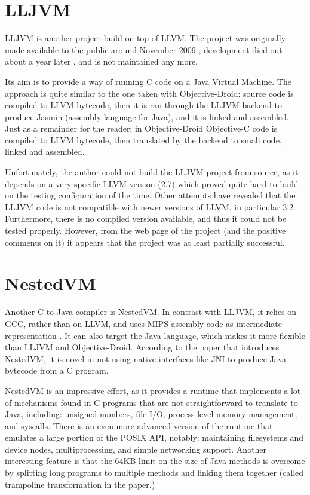 \documentclass[parskip]{cs4rep}
\begin{document}
\section{LLJVM}

LLJVM is another project build on top of LLVM. The project was originally made available to the public around November 2009 \cite{P12}, development died out about a year later \cite{P13}, and is not maintained any more.

Its aim is to provide a way of running C code on a Java Virtual Machine. The approach is quite similar to the one taken with Objective-Droid: source code is compiled to LLVM bytecode, then it is ran through the LLJVM backend to produce Jasmin (assembly language for Java), and it is linked and assembled. Just as a remainder for the reader: in Objective-Droid Objective-C code is compiled to LLVM bytecode, then translated by the backend to smali code, linked and assembled.

Unfortunately, the author could not build the LLJVM project from source, as it depends on a very specific LLVM version (2.7) which proved quite hard to build on the testing configuration of the time. Other attempts have revealed that the LLJVM code is not compatible with newer versions of LLVM, in particular 3.2. Furthermore, there is no compiled version available, and thus it could not be tested properly. However, from the web page of the project (and the positive comments on it) it appears that the project was at least partially successful.

\section{NestedVM}

Another C-to-Java compiler is NestedVM. In contrast with LLJVM, it relies on GCC, rather than on LLVM, and uses MIPS assembly code as intermediate representation \cite{AllietMegacz:ivme:2004}. It can also target the Java language, which makes it more flexible than LLJVM and Objective-Droid. According to the paper that introduces NestedVM, it is novel in not using native interfaces like JNI to produce Java bytecode from a C program.

NestedVM is an impressive effort, as it provides a runtime that implements a lot of mechanisms found in C programs that are not straightforward to translate to Java, including: unsigned numbers, file I/O, process-level memory management, and syscalls. There is an even more advanced version of the runtime that emulates a large portion of the POSIX API, notably: maintaining filesystems and device nodes, multiprocessing, and simple networking support. Another interesting feature is that the 64KB limit on the size of Java methods is overcome by splitting long programs to multiple methods and linking them together (called trampoline transformation in the paper.)
\end{document}
